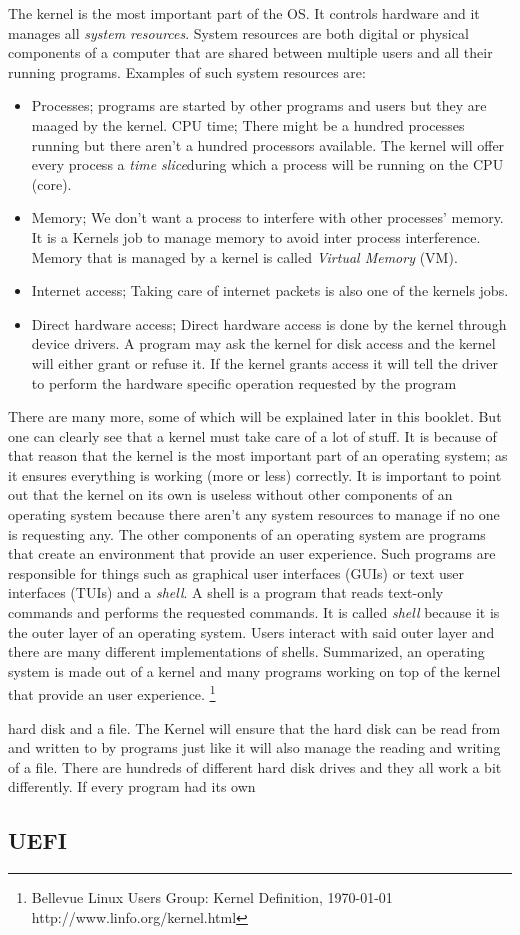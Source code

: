 The kernel is the most important part of the OS. It controls hardware and it
manages all \textit{system resources}. System resources are both digital or physical
components of a computer that are shared between multiple users and all their
running programs. Examples of such system resources are:
\begin{itemize}
\item Processes; programs are started by other programs and users but they are maaged by the kernel.
	CPU time; There might be a hundred processes running but there aren't a hundred processors available. The kernel will offer every process a \textit{time slice}during which a process will be running on the CPU (core).
\item Memory; We don't want a process to interfere with other processes' memory. It is a Kernels job to manage memory to avoid inter process interference. Memory that is managed by a kernel is called \textit{Virtual Memory} (VM).
\item Internet access; Taking care of internet packets is also one of the kernels jobs.
\item Direct hardware access; Direct hardware access is done by the kernel through device drivers. A program may ask the kernel for disk access and the kernel will either grant or refuse it. If the kernel grants access it will tell the driver to perform the hardware specific operation requested by the program
\end{itemize}
There are many more, some of which will be explained later in this booklet.
But one can clearly see that a kernel must take care of a lot of stuff. It
is because of that reason that the kernel is the most important part of an
operating system; as it ensures everything is working (more or less)
correctly. It is important to point out that the kernel on its own is useless
without other components of an operating system because there aren't any
system resources to manage if no one is requesting any.
The other components of an
operating system are programs that create an environment that provide an user
experience. Such programs are responsible for things such as graphical user
interfaces (GUIs) or text user interfaces (TUIs) and a \textit{shell}. A shell is a
program that reads text-only commands and performs the requested commands. It
is called \textit{shell} because it is the outer layer of an operating system. Users
interact with said outer layer and there are many different implementations
of shells. Summarized, an operating system is made out of a kernel and many programs working on top of the kernel that provide an user experience. \footnote{Bellevue Linux Users Group: Kernel Definition, \today \\ http://www.linfo.org/kernel.html}


hard disk and a
file. The Kernel will ensure that the hard disk can be read from and written
to by programs just like it will also manage the reading and writing of a
file. There are hundreds of different hard disk drives and they all work a
bit differently. If every program had its own 

\subsection{UEFI}
